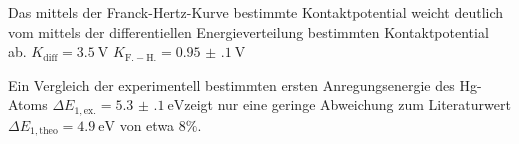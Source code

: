 Das mittels der Franck-Hertz-Kurve bestimmte Kontaktpotential weicht deutlich vom mittels der differentiellen Energieverteilung bestimmten Kontaktpotential ab.
$K_{\mathrm{diff}}=\SI{3.5}{\volt}$
$K_\mathrm{F.-H.}=\SI{0.95(10)}{\volt}$

Ein Vergleich der experimentell bestimmten ersten Anregungsenergie des Hg-Atoms $\Delta E_{1\mathrm{,ex.}}=\SI{5.3(1)}{\electronvolt}$zeigt nur eine geringe Abweichung zum Literaturwert $\Delta E_{1 \mathrm{,theo}}=\SI{4.9}{\electronvolt}$\cite{gott} von etwa $8\%$.
